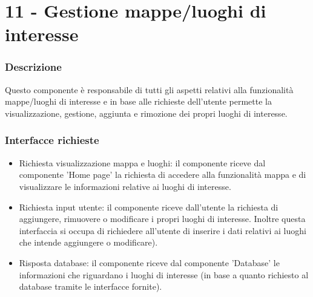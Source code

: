 \documentclass[a4paper,12pt]{article}
\begin{document}
\section*{11 -  Gestione mappe/luoghi di interesse}
\subsubsection*{Descrizione}
Questo componente è responsabile di tutti gli aspetti relativi alla funzionalità mappe/luoghi di interesse e in base alle richieste dell'utente permette la visualizzazione, gestione, aggiunta e rimozione dei propri luoghi di interesse.
\subsubsection*{Interfacce richieste}
\begin{itemize} \setlength\itemsep{0.01em}
\item {\sffamily Richiesta visualizzazione mappa e luoghi}: il componente riceve dal componente 'Home page'  la richiesta di accedere alla funzionalità mappa e di visualizzare le informazioni relative ai luoghi di interesse.
\item {\sffamily Richiesta input utente}: il componente riceve dall'utente la richiesta di aggiungere, rimuovere o modificare i propri luoghi di interesse. Inoltre questa interfaccia si occupa di richiedere all'utente di inserire i dati relativi ai luoghi che intende aggiungere o modificare).
\item {\sffamily Risposta database}: il componente riceve dal componente 'Database' le informazioni che riguardano i luoghi di interesse (in base a quanto richiesto al database tramite le interfacce fornite).

\end{itemize}
\end{document}
